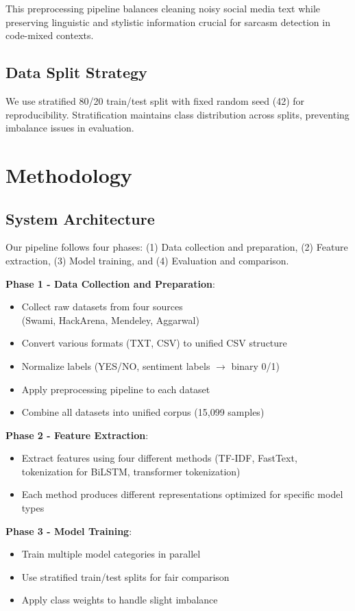 \documentclass[11pt]{article}
\begin{document}
This preprocessing pipeline balances cleaning noisy social media text while preserving linguistic and stylistic information crucial for sarcasm detection in code-mixed contexts.

\subsection{Data Split Strategy}

We use stratified 80/20 train/test split with fixed random seed (42) for reproducibility. Stratification maintains class distribution across splits, preventing imbalance issues in evaluation.

\section{Methodology}

\subsection{System Architecture}

Our pipeline follows four phases: (1) Data collection and preparation, (2) Feature extraction, (3) Model training, and (4) Evaluation and comparison.

\textbf{Phase 1 - Data Collection and Preparation}:
\begin{itemize}
\item Collect raw datasets from four sources\\ (Swami, HackArena, Mendeley, Aggarwal)
\item Convert various formats (TXT, CSV) to unified CSV structure
\item Normalize labels (YES/NO, sentiment labels $\rightarrow$ binary 0/1)
\item Apply preprocessing pipeline to each dataset
\item Combine all datasets into unified corpus (15,099 samples)
\end{itemize}

\textbf{Phase 2 - Feature Extraction}:
\begin{itemize}
\item Extract features using four different methods (TF-IDF, FastText, tokenization for BiLSTM, transformer tokenization)
\item Each method produces different representations optimized for specific model types
\end{itemize}

\textbf{Phase 3 - Model Training}:
\begin{itemize}
\item Train multiple model categories in parallel
\item Use stratified train/test splits for fair comparison
\item Apply class weights to handle slight imbalance
\end{itemize}
\end{document}
